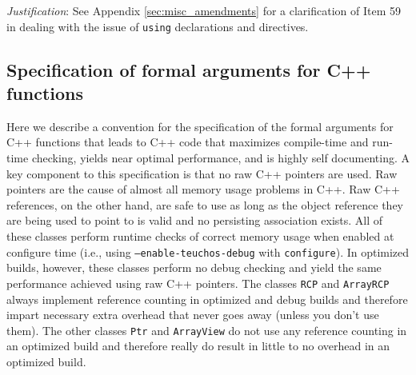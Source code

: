 \begin{enumerate}
{}\textit{Justification}: See Appendix {}\ref{sec:misc_amendments} for a
clarification of Item 59 in {}\cite{C++CodingStandards05} dealing with the
issue of {}\texttt{using} declarations and directives.


\end{enumerate}

%
\subsection{Specification of formal arguments for C++ functions}
\label{sec:func_arguments}
%

Here we describe a convention for the specification of the formal arguments
for C++ functions that leads to C++ code that maximizes compile-time and
run-time checking, yields near optimal performance, and is highly self
documenting.  A key component to this specification is that no raw C++
pointers are used.  Raw pointers are the cause of almost all memory usage
problems in C++.  Raw C++ references, on the other hand, are safe to use as
long as the object reference they are being used to point to is valid and no
persisting association exists.  All of these classes perform runtime checks of
correct memory usage when enabled at configure time (i.e., using
{}\texttt{--enable-teuchos-debug} with {}\texttt{configure}).  In optimized
builds, however, these classes perform no debug checking and yield the same
performance achieved using raw C++ pointers.  The classes {}\texttt{RCP} and
{}\texttt{ArrayRCP} always implement reference counting in optimized and debug
builds and therefore impart necessary extra overhead that never goes away
(unless you don't use them).  The other classes {}\texttt{Ptr} and
{}\texttt{ArrayView} do not use any reference counting in an optimized build
and therefore really do result in little to no overhead in an optimized build.

